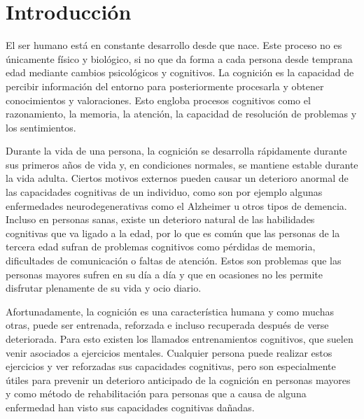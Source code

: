 
\label{chp:Introduccion}

\section{Introducción}


El ser humano está en constante desarrollo desde que nace. Este proceso no es únicamente físico y biológico, si no que da forma a cada persona desde temprana edad mediante cambios psicológicos y cognitivos. La cognición es la capacidad de percibir información del entorno para posteriormente procesarla y obtener conocimientos y valoraciones. Esto engloba procesos cognitivos como el razonamiento, la memoria, la atención, la capacidad de resolución de problemas y los sentimientos.

 Durante la vida de una persona, la cognición se desarrolla rápidamente durante sus primeros años de vida y, en condiciones normales, se mantiene estable durante la vida adulta. Ciertos motivos externos pueden causar un deterioro anormal de las capacidades cognitivas de un individuo, como son por ejemplo algunas enfermedades neurodegenerativas como el Alzheimer u otros tipos de demencia. Incluso en personas sanas, existe un deterioro natural de las habilidades cognitivas que va ligado a la edad, por lo que es común que las personas de la tercera edad sufran de problemas cognitivos como pérdidas de memoria, dificultades de comunicación o faltas de atención. Estos son problemas que las personas mayores sufren en su día a día y que en ocasiones no les permite disfrutar plenamente de su vida y ocio diario.
 
Afortunadamente, la cognición es una característica humana y como muchas otras, puede ser entrenada, reforzada e incluso recuperada después de verse deteriorada. Para esto existen los llamados entrenamientos cognitivos, que suelen venir asociados a ejercicios mentales. Cualquier persona puede realizar estos ejercicios y ver reforzadas sus capacidades cognitivas, pero son especialmente útiles para prevenir un deterioro anticipado de la cognición en personas mayores y como método de rehabilitación para personas que a causa de alguna enfermedad han visto sus capacidades cognitivas dañadas.


